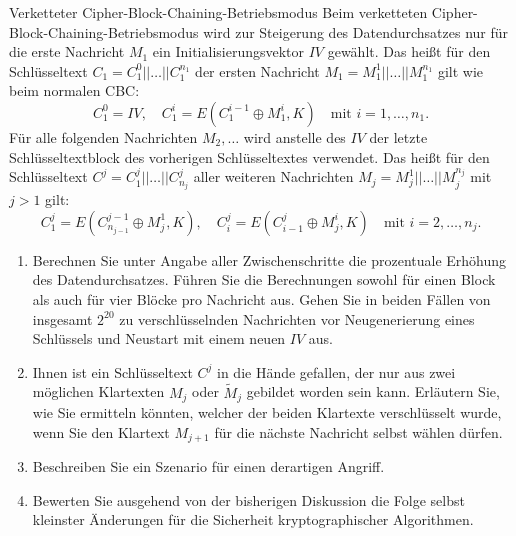 \documentclass{article}
\begin{document}
\setcounter{subsection}{50}
\begin{exercise}{Verketteter Cipher-Block-Chaining-Betriebsmodus}
  Beim verketteten Cipher-Block-Chaining-Betriebsmodus wird zur Steigerung des Datendurchsatzes nur für die erste Nachricht $ M_1 $ ein Initialisierungsvektor $ IV $ gewählt. Das heißt für den Schlüsseltext $ C_1 = C_1^0 || \ldots || C_1^{n_1} $ der ersten Nachricht $ M_1 = M_1^1 || \ldots || M_1^{n_1} $ gilt wie beim normalen CBC:
  \[
      C_1^0 = IV, \quad C_1^i = E(C_1^{i-1} \oplus M_1^i, K) \quad \text{mit } i = 1, \ldots, n_1.
  \]
  Für alle folgenden Nachrichten $ M_2, \ldots $ wird anstelle des $ IV $ der letzte Schlüsseltextblock des vorherigen Schlüsseltextes verwendet. Das heißt für den Schlüsseltext $ C^j = C^j_1 || \ldots || C^j_{n_j} $ aller weiteren Nachrichten $ M_j = M_j^1 || \ldots || M_j^{n_j} $ mit $ j > 1 $ gilt:
  \[
      C^j_1 = E(C^{j-1}_{n_{j-1}} \oplus M_j^1, K), \quad C^j_i = E(C^j_{i-1} \oplus M_j^i, K) \quad \text{mit } i = 2, \ldots, n_j.
  \]
  \begin{enumerate}
    \item Berechnen Sie unter Angabe aller Zwischenschritte die prozentuale Erhöhung des Datendurchsatzes. Führen Sie die Berechnungen sowohl für einen Block als auch für vier Blöcke pro Nachricht aus. Gehen Sie in beiden Fällen von insgesamt $ 2^{20} $ zu verschlüsselnden Nachrichten vor Neugenerierung eines Schlüssels und Neustart mit einem neuen $ IV $ aus.
    \item Ihnen ist ein Schlüsseltext $ C^j $ in die Hände gefallen, der nur aus zwei möglichen Klartexten $ M_j $ oder $ \tilde{M}_j $ gebildet worden sein kann. Erläutern Sie, wie Sie ermitteln könnten, welcher der beiden Klartexte verschlüsselt wurde, wenn Sie den Klartext $ M_{j+1} $ für die nächste Nachricht selbst wählen dürfen.
    \item Beschreiben Sie ein Szenario für einen derartigen Angriff.
    \item Bewerten Sie ausgehend von der bisherigen Diskussion die Folge selbst kleinster Änderungen für die Sicherheit kryptographischer Algorithmen.
  \end{enumerate}


\end{exercise}
\end{document}
